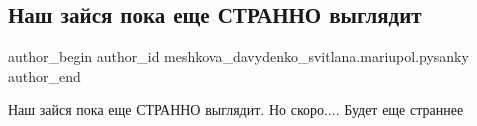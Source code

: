  
 
 
 
 

\subsection{Наш зайся пока еще СТРАННО выглядит}
\label{sec:28_03_2018.fb.meshkova_davydenko_svitlana.mariupol.pysanky.1.nash_zajsha_poka_esche_stranno_vygljadit}

\ifcmt
 author_begin
   author_id meshkova_davydenko_svitlana.mariupol.pysanky
 author_end
\fi

Наш зайся пока еще СТРАННО выглядит. Но скоро.... Будет еще страннее
